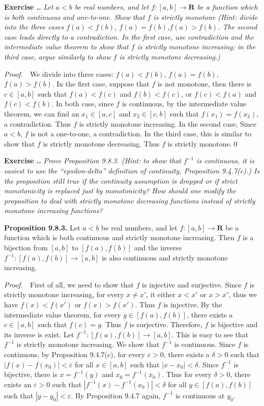 \documentclass{book}
\newcommand{\pff}{\vspace{.25em}\noindent\emph{Proof.}~~}
\newcommand{\titl}[1]{\noindent\textbf{#1}}
\newcounter{Exercise}[section]
\renewcommand{\theExercise}{\thesection.\arabic{Exercise}.}
\newcommand{\new}{\vspace{1.5em}\noindent\textbf{{Exercise \stepcounter{Exercise}\textbf{\theExercise}}} }
\begin{document}
\new\emph{Let $a<b$ be real numbers, and let $f:[a,b]\to\mathbf{R}$ be a function which is both continuous and one-to-one. Show that $f$ is strictly monotone (Hint: divide into the three cases $f(a)<f(b)$, $f(a)=f(b)$,$f(a)>f(b)$. The second case leads directly to a contradiction. In the first case, use contradiction and the intermediate value theorem to show that $f$ is strictly monotone increasing; in the third case, argue similarly to show $f$ is strictly monotone decreasing.)}

\pff We divide into three cases: $f(a)<f(b)$, $f(a)=f(b)$,$f(a)>f(b)$. In the first case, suppose that $f$ is not monotone, then there is $c\in[a,b]$ such that $f(a)<f(c)$ and $f(b)<f(c)$, or $f(c)<f(a)$ and $f(c)<f(b)$. In both case, since $f$ is continuous, by the intermediate value theorem, we can find an $x_1\in[a,c]$ and $x_2\in[c,b]$ such that $f(x_1)=f(x_2)$, a contradiction. Thus $f$ is strictly monotone increasing. In the second case, Since $a<b$, $f$ is not a one-to-one, a contradiction. In the third case, this is similar to show that $f$ is strictly monotone decreasing. Thus $f$ is strictly monotone.\qed

\new\emph{Prove Proposition 9.8.3. (Hint: to show that $f^{-1}$ is continuous, it is easiest to use the ``epsilon-delta'' definition of continuity, Proposition 9.4.7(c).) Is the proposition still true if the continuity assumption is dropped or if strict monotonicity is replaced just by monotonicity? How should one modify the proposition to deal with strictly monotone decreasing functions instead of strictly monotone increasing functions?}

\begin{framed}
\titl{Proposition 9.8.3.} Let $a<b$ be real numbers, and let $f:[a,b]\to\mathbf{R}$ be a function which is both continuous and strictly monotone increasing. Then $f$ is a bijection from $[a,b]$ to $[f(a),f(b)]$ and the inverse $f^{-1}:[f(a),f(b)]\to[a,b]$ is also continuous and strictly monotone increasing.
\end{framed}

\pff First of all, we need to show that $f$ is injective and surjective. Since $f$ is strictly monotone increasing, for every $x\neq x'$, it either $x<x'$ or $x>x'$, thus we have $f(x)<f(x')$ or $f(x)>f(x')$. Thus $f$ is injective. By the intermediate value theorem, for every $y\in[f(a),f(b)]$, there exists a $c\in[a,b]$ such that $f(c)=y$. Thus $f$ is surjective. Therefore, $f$ is bijective and its inverse is exist. Let $f^{-1}:[f(a),f(b)]\to[a,b]$. This is easy to see that $f^{-1}$ is strictly monotone increasing. We show that $f^{-1}$ is continuous. Since $f$ is continuous, by Proposition 9.4.7(c), for every $\varepsilon>0$, there exists a $\delta>0$ such that $|f(x)-f(x_0)|<\varepsilon$ for all $x\in[a,b]$ such that $|x-x_0|<\delta$. Since $f^{-1}$ is bijective, there is $x=f^{-1}(y)$ and $x_0=f^{-1}(x_0)$. Thus for every $\delta>0$, there exists an $\varepsilon>0$ such that $|f^{-1}(x)-f^{-1}(x_0)|<\delta$ for all $y\in[f(a),f(b)]$ such that $|y-y_0|<\varepsilon$. By Proposition 9.4.7 again, $f^{-1}$ is continuous at $y_0$.
\end{document}
